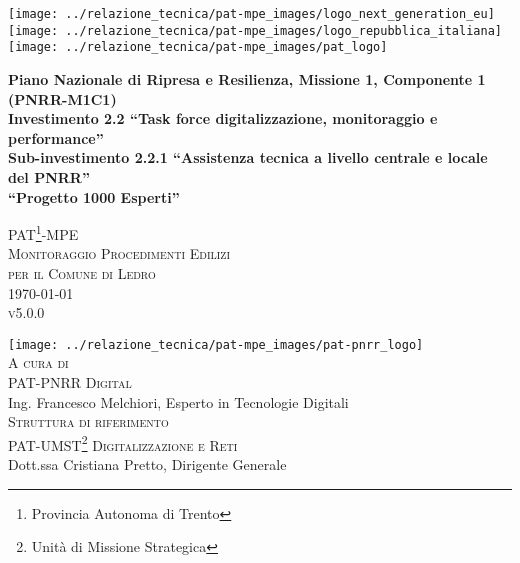 \documentclass[a4paper]{article}
\begin{document}
	\begin{center}
		\texttt{[image: ../relazione\_tecnica/pat-mpe\_images/logo\_next\_generation\_eu]} \hspace{1.25cm} \texttt{[image: ../relazione\_tecnica/pat-mpe\_images/logo\_repubblica\_italiana]} \hspace{1.25cm} \texttt{[image: ../relazione\_tecnica/pat-mpe\_images/pat\_logo]}\\
		\vspace{0.5cm}
	\end{center}
	\begin{center}
		\textbf{\textcolor{custom-blue}{Piano Nazionale di Ripresa e Resilienza, Missione 1, Componente 1 (PNRR-M1C1)}}\\
		\textbf{\textcolor{custom-blue}{Investimento 2.2 ``Task force digitalizzazione, monitoraggio e performance''}}\\
		\textbf{\textcolor{custom-blue}{Sub-investimento 2.2.1 ``Assistenza tecnica a livello centrale e locale del PNRR''}}\\
		\textbf{\textcolor{custom-blue}{``Progetto 1000 Esperti''}}\\
		\vspace{4.75cm}
	\end{center}
	\begin{center}
		\textsc{\LARGE{PAT\footnote{Provincia Autonoma di Trento}-MPE}}\\
        \vspace{0.1cm}
        \textsc{\Large{Monitoraggio Procedimenti Edilizi}}\\
		\vspace{0.75cm}
		\textsc{\large{per il} \Large{Comune di Ledro}}\\
		\vspace{0.75cm}
		\textsc{\Large{\today}}\\
        \vspace{0.3cm}
        \textsc{\large{v5.0.0}}\\
		\vspace{4cm}
	\end{center}
	\begin{flushright}
		\texttt{[image: ../relazione\_tecnica/pat-mpe\_images/pat-pnrr\_logo]}\\
		\vspace{0.5cm}
		\textsc{\normalsize{A cura di}}\\
        \textsc{\large{PAT-PNRR Digital}}\\
		\large{Ing. Francesco Melchiori}\normalsize{, Esperto in Tecnologie Digitali}\\
		\vspace{0.5cm}
		\textsc{\normalsize{Struttura di riferimento}}\\
		\textsc{\large{PAT-UMST\footnote{Unità di Missione Strategica} Digitalizzazione e Reti}}\\
		\large{Dott.ssa Cristiana Pretto}\normalsize{, Dirigente Generale}\\
	\end{flushright}
	\clearpage
\end{document}
